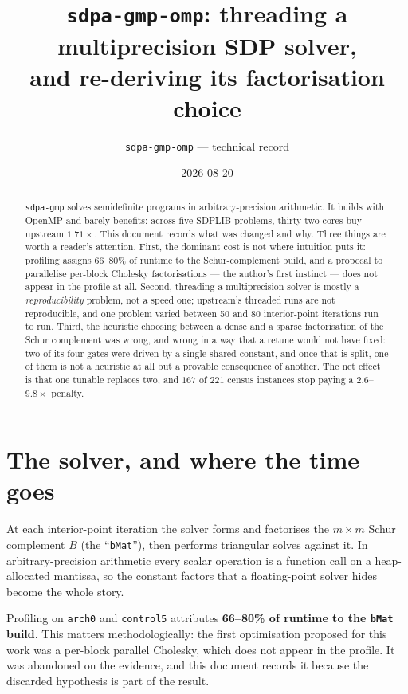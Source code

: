 \documentclass[11pt]{article}
\title{\texttt{sdpa-gmp-omp}: threading a multiprecision SDP solver,\\
and re-deriving its factorisation choice}
\author{\texttt{sdpa-gmp-omp} --- technical record}
\date{2026-08-20}
\newcommand{\bMat}{B}
\newcommand{\code}[1]{\texttt{#1}}
\begin{document}
\maketitle

\begin{abstract}
\noindent
\code{sdpa-gmp} solves semidefinite programs in arbitrary-precision arithmetic. It builds with
OpenMP and barely benefits: across five SDPLIB problems, thirty-two cores buy upstream
$1.71\times$. This document records what was changed and why. Three things are worth a reader's
attention. First, the dominant cost is not where intuition puts it: profiling assigns
66--80\% of runtime to the Schur-complement build, and a proposal to parallelise per-block
Cholesky factorisations --- the author's first instinct --- does not appear in the profile at all.
Second, threading a multiprecision solver is mostly a \emph{reproducibility} problem, not a
speed one; upstream's threaded runs are not reproducible, and one problem varied between 50 and
80 interior-point iterations run to run. Third, the heuristic choosing between a dense and a
sparse factorisation of the Schur complement was wrong, and wrong in a way that a retune would
not have fixed: two of its four gates were driven by a single shared constant, and once that is
split, one of them is not a heuristic at all but a provable consequence of another. The net
effect is that one tunable replaces two, and $167$ of $221$ census instances stop paying a
$2.6$--$9.8\times$ penalty.
\end{abstract}

\tableofcontents

\section{The solver, and where the time goes}

At each interior-point iteration the solver forms and factorises the $m \times m$ Schur
complement $\bMat$ (the ``\code{bMat}''), then performs triangular solves against it. In
arbitrary-precision arithmetic every scalar operation is a function call on a heap-allocated
mantissa, so the constant factors that a floating-point solver hides become the whole story.

Profiling on \code{arch0} and \code{control5} attributes \textbf{66--80\% of runtime to the
\code{bMat} build}. This matters methodologically: the first optimisation proposed for this work
was a per-block parallel Cholesky, which does not appear in the profile. It was abandoned on the
evidence, and this document records it because the discarded hypothesis is part of the result.
\end{document}
